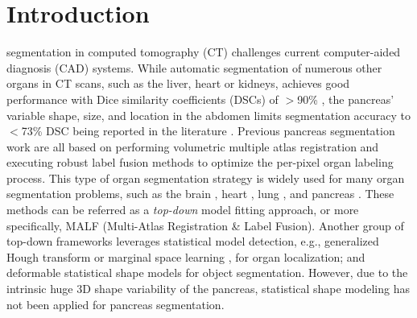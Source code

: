 \documentclass[journal]{IEEEtran}
\begin{document}
\section{Introduction}
 segmentation in computed tomography (CT) challenges current computer-aided diagnosis (CAD) systems. While automatic segmentation of numerous other organs in CT scans, such as the liver, heart or kidneys, achieves good performance with Dice similarity coefficients (DSCs) of $>$90\% \cite{Wang2014Miccai,Chu2013Miccai,wolz2013automated}, the pancreas' variable shape, size, and location in the abdomen limits segmentation accuracy to $<$73\% DSC being reported in the literature \cite{wolz2013automated,Chu2013Miccai,tong2015discriminative,okada2015abdominal,farag2014bottom,roth2015deeporgan}. Previous pancreas segmentation work \cite{wolz2013automated,Chu2013Miccai,tong2015discriminative,okada2015abdominal} are all based on performing volumetric multiple atlas registration \cite{Modat2010,avants2009advanced,Avants2011reproducible} and executing robust label fusion methods \cite{Wang2013Multi,Bai2013probabilistic,Wang2014Segmentation} to optimize the per-pixel organ labeling process. This type of organ segmentation strategy is widely used for many organ segmentation problems, such as the brain \cite{Wang2013Multi,Wang2014Segmentation}, heart \cite{Bai2013probabilistic}, lung \cite{Murphy2011Evaluation}, and pancreas \cite{wolz2013automated,Chu2013Miccai,tong2015discriminative,okada2015abdominal}. These methods can be referred as a {\em top-down} model fitting approach, or more specifically, MALF (Multi-Atlas Registration \& Label Fusion). Another group of top-down frameworks \cite{Ecabert2008Automatic,Zheng08,Ling08} leverages statistical model detection, e.g., generalized Hough transform \cite{Ecabert2008Automatic} or marginal space learning \cite{Zheng08,Ling08}, for organ localization; and deformable statistical shape models for object segmentation. However, due to the intrinsic huge 3D shape variability of the pancreas, statistical shape modeling has not been applied for pancreas segmentation.
\end{document}
